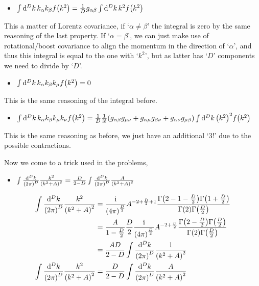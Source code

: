 \begin{itemize}
    \item $\int\dd[D]{k}k_\alpha k_\beta f\qty(k^2)=\frac 1Dg_{\alpha\beta}\int\dd[D]{k}k^2f\qty(k^2)$
\end{itemize}

This a matter of Lorentz covariance, if `$\alpha\neq \beta$' the integral is zero by the same reasoning of the 
last property. If `$\alpha=\beta$', we can just make use of rotational/boost covariance to align the momentum 
in the direction of `$\alpha$', and thus this integral is equal to the one with `$k^2$', but as latter has `$D$' 
components we need to divide by `$D$'.

\begin{itemize}
    \item $\int\dd[D]{k}k_\alpha k_\beta k_\mu f\qty(k^2)=0$
\end{itemize}

This is the same reasoning of the integral before.

\begin{itemize}
    \item $\int\dd[D]{k}k_\alpha k_\beta k_\mu k_\nu f\qty(k^2)=\frac 1D\frac{1}{3!}\qty(g_{\alpha\beta}g_{\mu\nu}+g_{\alpha\mu}g_{\beta\nu}+g_{\alpha\nu}g_{\mu\beta})\int\dd[D]{k}\qty(k^2)^2 f\qty(k^2)$
\end{itemize}

This is the same reasoning as before, we just have an additional `$3!$' due to the possible contractions.

Now we come to a trick used in the problems,

\begin{itemize}
    \item $\int\frac{\dd[D]{k}}{\qty(2\pi)^D}\frac{k^2}{\qty(k^2+A)^2}=\frac{D}{2-D}\int\frac{\dd[D]{k}}{\qty(2\pi)^D}\frac{A}{\qty(k^2+A)^2}$
\end{itemize}

\begin{align}
    \int\frac{\dd[D]{k}}{\qty(2\pi)^D}\frac{k^2}{\qty(k^2+A)^2}&=\frac{\textnormal{i}}{\qty(4\pi)^{\frac D2}}A^{-2+\frac D2+1}\frac{\Gamma\qty(2-1-\frac D2)\Gamma\qty(1+\frac D2)}{\Gamma\qty(2)\Gamma\qty(\frac D2)}\nonumber\\
    &=\frac{A}{1-\frac D2}\frac D2\frac{\textnormal{i}}{\qty(4\pi)^{\frac D2}} A^{-2+\frac D2}\frac{\Gamma\qty(2-\frac D2)\Gamma\qty(\frac D2)}{\Gamma\qty(2)\Gamma\qty(\frac D2)}\nonumber\\
    &=\frac{AD}{2-D}\int\frac{\dd[D]{k}}{\qty(2\pi)^D}\frac{1}{\qty(k^2+A)^2}\nonumber\\
    \int\frac{\dd[D]{k}}{\qty(2\pi)^D}\frac{k^2}{\qty(k^2+A)^2}&=\frac{D}{2-D}\int\frac{\dd[D]{k}}{\qty(2\pi)^D}\frac{A}{\qty(k^2+A)^2}\nonumber
\end{align}
